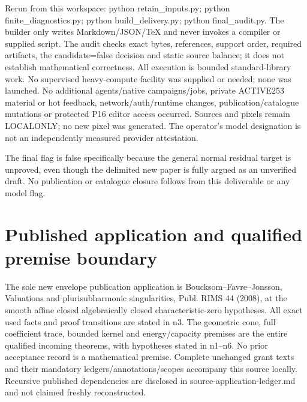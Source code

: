 \documentclass[11pt]{article}
\begin{document}
Rerun from this workspace: python retain\_inputs.py; python finite\_diagnostics.py; python build\_delivery.py; python final\_audit.py. The builder only writes Markdown/JSON/TeX and never invokes a compiler or supplied script. The audit checks exact bytes, references, support order, required artifacts, the candidate=false decision and static source balance; it does not establish mathematical correctness. All execution is bounded standard-library work. No supervised heavy-compute facility was supplied or needed; none was launched. No additional agents/native campaigns/jobs, private ACTIVE253 material or hot feedback, network/auth/runtime changes, publication/catalogue mutations or protected P16 editor access occurred. Sources and pixels remain LOCALONLY; no new pixel was generated. The operator's model designation is not an independently measured provider attestation.

The final flag is false specifically because the general normal residual target is unproved, even though the delimited new paper is fully argued as an unverified draft. No publication or catalogue closure follows from this deliverable or any model flag.
\section*{Published application and qualified premise boundary}
The sole new envelope publication application is Boucksom--Favre--Jonsson, Valuations and plurisubharmonic singularities, Publ. RIMS 44 (2008), at the smooth affine closed algebraically closed characteristic-zero hypotheses. All exact used facts and proof transitions are stated in n3. The geometric cone, full coefficient trace, bounded kernel and energy/capacity premises are the entire qualified incoming theorems, with hypotheses stated in n1--n6. No prior acceptance record is a mathematical premise. Complete unchanged grant texts and their mandatory ledgers/annotations/scopes accompany this source locally. Recursive published dependencies are disclosed in source-application-ledger.md and not claimed freshly reconstructed.
\end{document}

